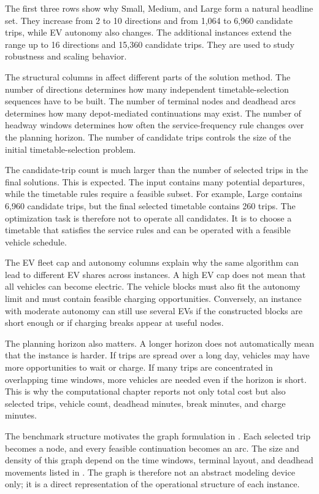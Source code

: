 The first three rows show why Small, Medium, and Large form a natural headline
set. They increase from 2 to 10 directions and from 1,064 to 6,960 candidate
trips, while EV autonomy also changes. The additional instances extend the
range up to 16 directions and 15,360 candidate trips. They are used to study
robustness and scaling behavior.

The structural columns in  affect different parts of the
solution method.  The number of directions determines how many independent
timetable-selection sequences have to be built.  The number of terminal nodes
and deadhead arcs determines how many depot-mediated continuations may exist.
The number of headway windows determines how often the service-frequency rule
changes over the planning horizon.  The number of candidate trips controls the
size of the initial timetable-selection problem.

The candidate-trip count is much larger than the number of selected trips in
the final solutions.  This is expected.  The input contains many potential
departures, while the timetable rules require a feasible subset.  For example,
Large contains 6,960 candidate trips, but the final selected timetable contains
260 trips.  The optimization task is therefore not to operate all candidates.
It is to choose a timetable that satisfies the service rules and can be
operated with a feasible vehicle schedule.

The EV fleet cap and autonomy columns explain why the same algorithm can lead
to different EV shares across instances.  A high EV cap does not mean that all
vehicles can become electric.  The vehicle blocks must also fit the autonomy
limit and must contain feasible charging opportunities.  Conversely, an
instance with moderate autonomy can still use several EVs if the constructed
blocks are short enough or if charging breaks appear at useful nodes.

The planning horizon also matters.  A longer horizon does not automatically
mean that the instance is harder.  If trips are spread over a long day, vehicles
may have more opportunities to wait or charge.  If many trips are concentrated
in overlapping time windows, more vehicles are needed even if the horizon is
short.  This is why the computational chapter reports not only total cost but
also selected trips, vehicle count, deadhead minutes, break minutes, and charge
minutes.

The benchmark structure motivates the graph formulation in
.  Each selected trip becomes a node, and every feasible
continuation becomes an arc.  The size and density of this graph depend on the
time windows, terminal layout, and deadhead movements listed in
.  The graph is therefore not an abstract modeling device
only; it is a direct representation of the operational structure of each
instance.
